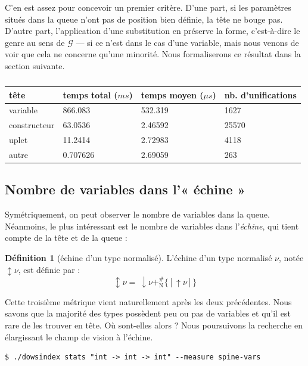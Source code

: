 \documentclass[a4paper]{report}
\theoremstyle{definition}
\newtheorem{definition}[theoreme]{Définition}
\newcommand{\mset}[1]{\{\![#1]\!\}}
\newcommand{\G}{\mathscr{G}}
\newcommand{\N}{\mathrm{N}}
\begin{document}
C'en est assez pour concevoir un premier critère. D'une part, si les paramètres situés dans la queue n'ont pas de position bien définie, la tête ne bouge pas. D'autre part, l'application d'une substitution en préserve la forme, c'est-à-dire le genre au sens de $\G$ — si ce n'est dans le cas d'une variable, mais nous venons de voir que cela ne concerne qu'une minorité. Nous formaliserons ce résultat dans la section suivante.

\begin{table}[h]
	\centering
	\begin{tabular}{|l|l|l|l|}
		\hline
			tête &
			temps total ($ms$) &
			temps moyen ($\mu s$) &
			nb. d'unifications
		\\
		\hline
			variable & 866.083 & 532.319 & 1627
		\\
			constructeur & 63.0536 & 2.46592 & 25570
		\\
			uplet & 11.2414 & 2.72983 & 4118
		\\
			autre & 0.707626 & 2.69059 & 263
		\\
		\hline
	\end{tabular}
	\caption{\label{tab_meas_2}}
\end{table}


\subsection{Nombre de variables dans l'« échine »}

Symétriquement, on peut observer le nombre de variables dans la queue. Néanmoins, le plus intéressant est le nombre de variables dans l'\emph{échine}, qui tient compte de la tête et de la queue :

\begin{definition}[échine d'un type normalisé]
	L'échine d'un type normalisé $\nu$, notée $\updownarrow \nu$, est définie par :
	\[ \updownarrow \nu =\ \downarrow \nu +^\#_\N \mset{\uparrow \nu} \]
\end{definition}

Cette troisième métrique vient naturellement après les deux précédentes. Nous savons que la majorité des types possèdent peu ou pas de variables et qu'il est rare de les trouver en tête. Où sont-elles alors ? Nous poursuivons la recherche en élargissant le champ de vision à l'échine.

\begin{verbatim}
$ ./dowsindex stats "int -> int -> int" --measure spine-vars
\end{verbatim}
\end{document}
